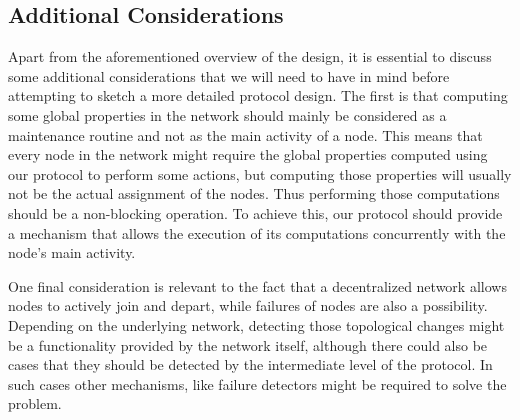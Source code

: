 \documentclass[MSc]{icldt}
\begin{document}
\subsection{Additional Considerations}

Apart from the aforementioned overview of the design, it is essential to discuss some additional considerations that we will need to have in mind before attempting to sketch a more detailed protocol design. The first is that computing some global properties in the network should mainly be considered as a maintenance routine and not as the main activity of a node. This means that every node in the network might require the global properties computed using our protocol to perform some actions, but computing those properties will usually not be the actual assignment of the nodes. Thus performing those computations should be a non-blocking operation. To achieve this, our protocol should provide a mechanism that allows the execution of its computations concurrently with the node's main activity.

One final consideration is relevant to the fact that a decentralized network allows nodes to actively join and depart, while failures of nodes are also a possibility. Depending on the underlying network, detecting those topological changes might be a functionality provided by the network itself, although there could also be cases that they should be detected by the intermediate level of the protocol. In such cases other mechanisms, like failure detectors \cite{Chandra:1996:UFD:226643.226647} might be required to solve the problem.   
\end{document}
